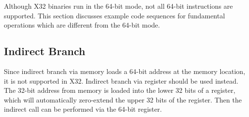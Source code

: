 Although X32 binaries run in the 64-bit mode, not all 64-bit instructions
are supported. This section discusses example code sequences for
fundamental operations which are different from the 64-bit mode.

\subsection{Indirect Branch}

Since indirect branch via memory loads a 64-bit address at the memory
location, it is not supported in X32.  Indirect branch via register
should be used instead.  The 32-bit address from memory is loaded into
the lower 32 bits of a register, which will automatically zero-extend
the upper 32 bits of the register.  Then the indirect call can be
performed via the 64-bit register. 

\begin{table}[H]
\Hrule
\caption{Indirect Branch}
\begin{center}
\end{center}
\Hrule
\end{table}
